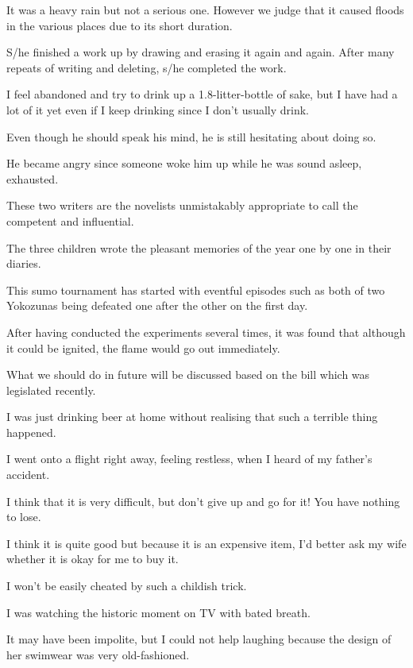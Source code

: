 \item[211.] It was a heavy rain but not a serious one. However we judge that it caused floods in the various places due to its short duration.
\item[212.] S/he finished a work up by drawing and erasing it again and again. After many repeats of writing and deleting, s/he completed the work.
\item[213.] I feel abandoned and try to drink up a 1.8-litter-bottle of sake, but I have had a lot of it yet even if I keep drinking since I don't usually drink.
\item[214.] Even though he should speak his mind, he is still hesitating about doing so.
\item[215.] He became angry since someone woke him up while he was sound asleep, exhausted.
\item[216.] These two writers are the novelists unmistakably appropriate to call the competent and influential. 
\item[217.] The three children wrote the pleasant memories of the year one by one in their diaries.
\item[218.] This sumo tournament has started with eventful episodes such as both of two Yokozunas being defeated one after the other on the first day.
\item[219.] After having conducted the experiments several times, it was found that although it could be ignited, the flame would  go out immediately.
\item[220.] What we should do in future will be discussed based on the bill which was legislated recently.
\item[221.] I was just drinking beer at home without realising that such a terrible thing happened.
\item[222.] I went onto a flight right away, feeling restless, when I heard of my father's accident.
\item[223.] I think that it is very difficult, but don't give up and go for it! You have nothing to lose.
\item[224.] I think it is quite good but because it is an expensive item, I'd better ask my wife whether it is okay for me to buy it.
\item[225.] I won't be easily cheated by such a childish trick.
\item[226.] I was watching the historic moment on TV with bated breath.
\item[227.] It may have been impolite, but I could not help laughing because the design of her swimwear was very old-fashioned.
